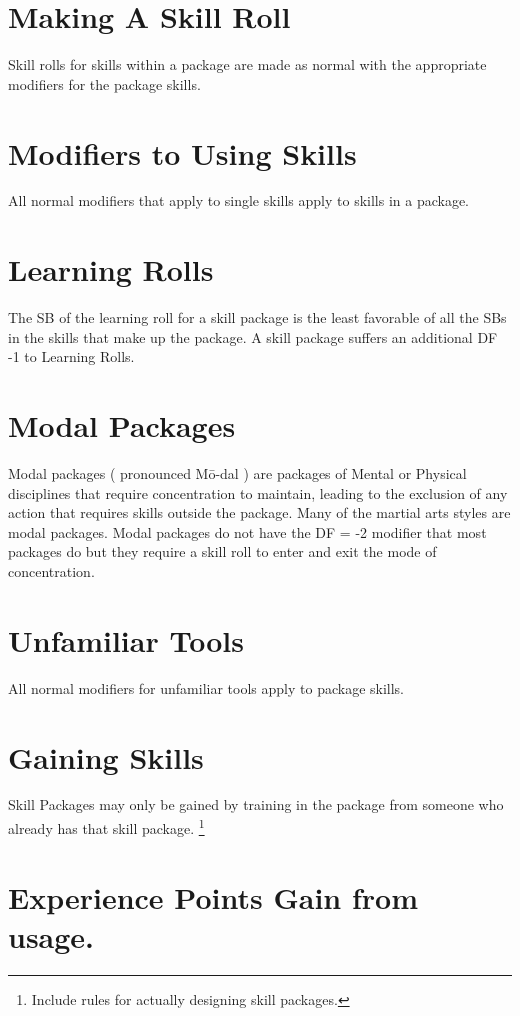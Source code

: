 \section{Making A Skill Roll}

Skill rolls for skills within a package are made as normal with the
appropriate modifiers for the package skills.

\section{Modifiers to Using Skills}
All normal modifiers that apply to single skills apply to skills in a package.

\section{Learning Rolls}
The SB of the learning roll for a skill package is the least favorable
of all the SBs in the skills that make up the package. A skill package
suffers an additional DF -1 to Learning Rolls.

\section{Modal Packages}

Modal packages ( pronounced M\=o-dal ) are packages of Mental or Physical disciplines
that require concentration to maintain, leading to the exclusion of any action that
requires skills outside the package. Many of the martial arts styles are modal
packages.  Modal packages do not have the DF = -2 modifier that most packages do
but they require a skill roll to enter and exit the mode of concentration.

\section{Unfamiliar Tools}
All normal modifiers for unfamiliar tools apply to package skills.

\section{Gaining Skills}
Skill Packages may only be gained by training in the package from
someone who already has that skill package. \footnote{ Include rules for
actually designing skill packages. }

\section{Experience Points Gain from usage.}


